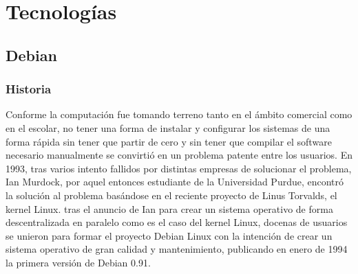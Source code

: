 \chapter[Tecnologías]{Tecnologías}
\label{Chap2}

\section{Debian}

\subsection{Historia}
Conforme la computación fue tomando terreno tanto en el ámbito comercial como en el escolar, no tener una forma de instalar y configurar los sistemas de una forma rápida sin tener que partir de cero y sin tener que compilar el software necesario manualmente se convirtió en un problema patente entre los usuarios.
\newline
\newline
En 1993, tras varios intento fallidos por distintas empresas de solucionar el problema, Ian Murdock, por aquel entonces estudiante de la Universidad Purdue, encontró la solución al problema basándose en el reciente proyecto de Linus Torvalds, el kernel Linux. tras el anuncio de Ian para crear un sistema operativo de forma descentralizada en paralelo como es el caso del kernel Linux, docenas de usuarios se unieron para formar el proyecto Debian Linux con la intención de crear un sistema operativo de gran calidad y mantenimiento, publicando en enero de 1994 la primera versión de Debian 0.91.

